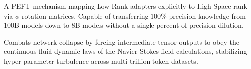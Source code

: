 \begin{tcolorbox}[
	enhanced,
	colback=nrccream!85!white,
	colframe=nrcblue,
	boxrule=0.5mm,
	title=\textbf{9. $\phi^\infty$ Lossless LoRA Adapter v3}
	]
	A PEFT mechanism mapping Low-Rank adapters explicitly to High-Space rank via $\phi$ rotation matrices. Capable of transferring $100\%$ precision knowledge from 100B models down to 8B models without a single percent of precision dilution.
\end{tcolorbox}

\begin{tcolorbox}[
	enhanced,
	colback=nrccream!85!white,
	colframe=nrcblue,
	boxrule=0.5mm,
	title=\textbf{10. Navier-Stokes Damping Regulariser v3}
	]
	Combats network collapse by forcing intermediate tensor outputs to obey the continuous fluid dynamic laws of the Navier-Stokes field calculations, stabilizing hyper-parameter turbulence across multi-trillion token datasets.
\end{tcolorbox}
